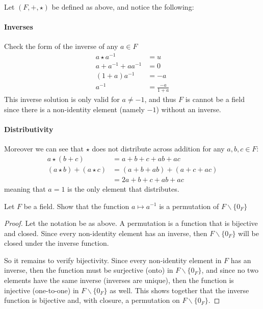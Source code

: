 \documentclass{article}
\begin{document}
\begin{solution}
Let $(F, +, \star)$ be defined as above, and notice the following:

\paragraph{Inverses}
Check the form of the inverse of any $a \in F$
\begin{align*}
a \star a^{-1} &= u \\
a + a^{-1} + aa^{-1} &= 0 \\
(1+a)a^{-1} &= -a \\
a^{-1} &= \frac{-a}{1+a}
\end{align*}
This inverse solution is only valid for $a \ne -1$, and thus $F$ is cannot be a field since there is a non-identity element (namely $-1$) without an inverse.

\paragraph{Distributivity}
Moreover we can see that $\star$ does not distribute across addition for any $a,b,c \in F$:
\begin{align*}
a \star (b+c) &= \boxed{a + b + c + ab + ac} \\
(a \star b) + (a \star c) &= (a + b + ab) + (a + c + ac) \\
&= \boxed{2a + b + c + ab + ac}
\end{align*}
meaning that $a=1$ is the only element that distributes.
\end{solution}

\setcounter{problem}{11}
\begin{problem}
Let $F$ be a field. Show that the function $a \mapsto a^{-1}$ is a permutation of $F \backslash \{0_{F}\}$
\end{problem}

\begin{solution}
\begin{proof}
Let the notation be as above. A permutation is a function that is bijective and closed. Since every non-identity element has an inverse, then $F \backslash \{0_{F}\}$ will be closed under the inverse function.

So it remains to verify bijectivity. Since every non-identity element in $F$ has an inverse, then the function must be surjective (onto) in $F \backslash \{0_{F}\}$, and since no two elements have the same inverse (inverses are unique), then the function is injective (one-to-one) in $F \backslash \{0_{F}\}$ as well. This shows together that the inverse function is bijective and, with closure, a permutation on $F \backslash \{0_{F}\}$.
\end{proof}
\end{solution}
\end{document}
